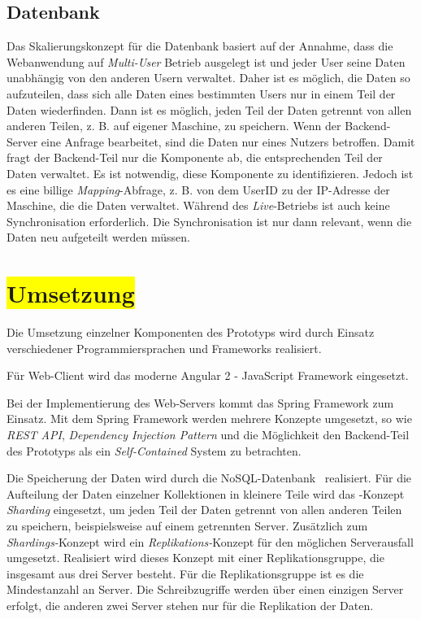 \subsection{Datenbank}

Das Skalierungskonzept für die Datenbank basiert auf der Annahme, dass die Webanwendung auf \textit{Multi-User} Betrieb ausgelegt ist und jeder User seine Daten unabhängig von den anderen Usern verwaltet. Daher ist es möglich, die Daten so aufzuteilen, dass sich alle Daten eines bestimmten Users nur in einem Teil der Daten wiederfinden. Dann ist es möglich, jeden Teil der Daten getrennt von allen anderen Teilen, z. B. auf eigener Maschine, zu speichern. Wenn der Backend-Server eine Anfrage bearbeitet, sind die Daten nur eines Nutzers betroffen. Damit fragt der Backend-Teil nur die Komponente ab, die entsprechenden Teil der Daten verwaltet. Es ist notwendig, diese Komponente zu identifizieren. Jedoch ist es eine billige \textit{Mapping}-Abfrage, z. B. von dem UserID zu der IP-Adresse der Maschine, die die Daten verwaltet. Während des \textit{Live}-Betriebs ist auch keine Synchronisation erforderlich. Die Synchronisation ist nur dann relevant, wenn die Daten neu aufgeteilt werden müssen.

\section{\colorbox{yellow}{Umsetzung}}

Die Umsetzung einzelner Komponenten des Prototyps wird durch Einsatz verschiedener Programmiersprachen und Frameworks realisiert.

Für Web-Client wird das moderne Angular 2 - JavaScript Framework eingesetzt.

Bei der Implementierung des Web-Servers kommt das Spring Framework zum Einsatz. Mit dem Spring Framework werden mehrere Konzepte umgesetzt, so wie \textit{REST API}, \textit{Dependency Injection Pattern} und die Möglichkeit den Backend-Teil des Prototyps als ein \textit{Self-Contained} System zu betrachten.

Die Speicherung der Daten wird durch die NoSQL-Datenbank \mongo\ realisiert. Für die Aufteilung der Daten einzelner Kollektionen in kleinere Teile wird das \mongo-Konzept \textit{Sharding} eingesetzt, um jeden Teil der Daten getrennt von allen anderen Teilen zu speichern, beispielsweise auf einem getrennten Server. Zusätzlich zum \textit{Shardings-}Konzept wird ein \textit{Replikations-}Konzept für den möglichen Serverausfall umgesetzt. Realisiert wird dieses Konzept mit einer Replikationsgruppe, die insgesamt aus drei Server besteht. Für die Replikationsgruppe ist es die Mindestanzahl an Server. Die Schreibzugriffe werden über einen einzigen Server erfolgt, die anderen zwei Server stehen nur für die Replikation der Daten.



